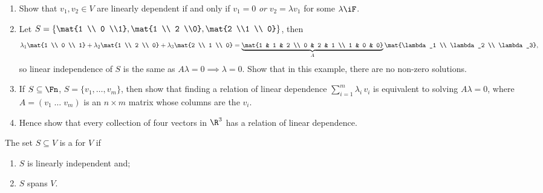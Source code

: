 \begin{exercises}
\mbox{}
\begin{enumerate}
	\item Show that $v_1,v_2\in V$ are linearly dependent if and only if $v_1=0$ \emph{or} $v_2=\lambda v_1$ for some $\lambda\iF$. %
	\item Let $S=\left\{ \mat{1 \\ 0 \\1},\mat{1 \\ 2 \\0},\mat{2 \\1 \\ 0}\right\}$, then
	\begin{equation*}
		\lambda_1 \mat{1 \\ 0 \\ 1} + \lambda_2 \mat{1 \\ 2 \\ 0} + \lambda_3 \mat{2 \\ 1 \\ 0} = \underbrace{\mat{1 & 1 & 2 \\ 0 & 2 & 1 \\ 1 & 0 & 0}}_A \mat{\lambda_1 \\ \lambda_2 \\ \lambda_3}, %
	\end{equation*}
	so linear independence of $S$ is the same as $A\lambda=0 \implies \lambda=0$. Show that in this example, there are no non-zero solutions.

	\item If $S\subseteq\Fn$, $S=\{v_1,\ldots,v_m\}$, then show that finding a relation of linear dependence $\sum_{i=1}^m \lambda_i \, v_i$ is equivalent to solving $A\lambda=0$, where $A=(v_1\;\ldots\;v_m)$ is an $n\times m$ matrix whose columns are the $v_i$. %
	\item Hence show that every collection of four vectors in $\R^3$ has a relation of linear dependence. %
\end{enumerate}
\end{exercises}

\begin{definition}
	The set $S\subseteq V$ is a  for $V$ if %
	\begin{enumerate}
		\shortskip
		\item $S$ is linearly independent and;
		\item $S$ spans $V$.
	\end{enumerate}
\end{definition}

